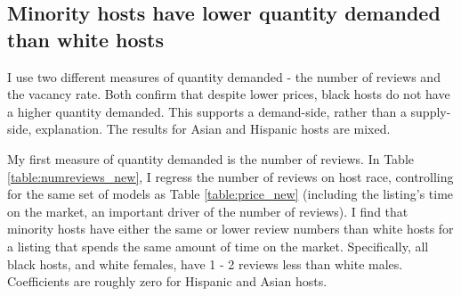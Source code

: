\subsection*{Minority hosts have lower quantity demanded than white hosts}

 
I use two different measures of quantity demanded - the number of reviews and the vacancy rate. Both confirm that despite lower prices, black hosts do not have a higher quantity demanded. This supports a demand-side, rather than a supply-side, explanation. The results for Asian and Hispanic hosts are mixed. 

My first measure of quantity demanded is the number of reviews. In Table \ref{table:numreviews_new}, I regress the number of reviews on host race, controlling for the same set of models as Table \ref{table:price_new} (including the listing's time on the market, an important driver of the number of reviews). I find that minority hosts have either the same or lower review numbers than white hosts for a listing that spends the same amount of time on the market. Specifically, all black hosts, and white females, have 1 - 2 reviews less than white males. Coefficients are roughly zero for Hispanic and Asian hosts. 

